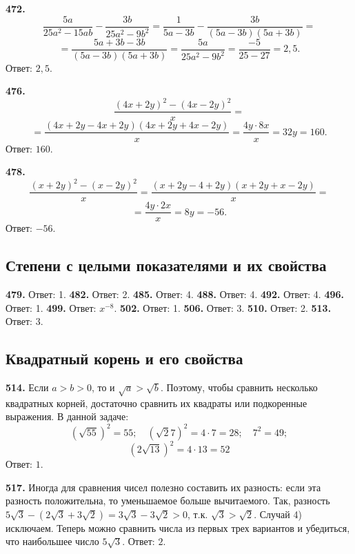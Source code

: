 \textbf{472.} $$\frac{5a}{25a^2-15ab}-\frac{3b}{25a^2-9b^2}=\frac{1}{5a-3b}-\frac{3b}{\left(5a-3b\right)\left(5a+3b\right)}=$$ $$=\frac{5a+3b-3b}{\left(5a-3b\right)\left(5a+3b\right)}=\frac{5a}{25a^2-9b^2}=\frac{-5}{25-27}=2,5.$$ \newline \null \hspace*{\fill} Ответ: $2,5$. 

\textbf{476.} $$\frac{\left(4x+2y\right)^2-\left(4x-2y\right)^2}{x}=$$$$=\frac{\left(4x+2y-4x+2y\right)\left(4x+2y+4x-2y\right)}{x}=\frac{4y\cdot8x}{x}=32y=160.$$ \newline \null \hspace*{\fill} Ответ: $160$. 

\textbf{478.} $$\frac{\left(x+2y\right)^2-\left(x-2y\right)^2}{x}=\frac{\left(x+2y-4+2y\right)\left(x+2y+x-2y\right)}{x}=$$ $$=\frac{4y\cdot2x}{x}=8y=-56.$$ \newline \null \hspace*{\fill} Ответ: $-56$. 

\subsection{Степени с целыми показателями и их свойства}


\textbf{479.}  Ответ: 1.  \textbf{482.}  Ответ: 2.  \textbf{485.}  Ответ: 4.  \textbf{488.}  Ответ: 4.  \textbf{492.}  Ответ: 4. \textbf{496.}  Ответ: 1. \textbf{499.}  Ответ: $x^{-8}$.   \textbf{502.}  Ответ: 1.  \textbf{506.} Ответ: 3. \textbf{510.}  Ответ: 2.  \textbf{513.}  Ответ: 3.

\subsection{Квадратный корень и его свойства}


\textbf{514.} Если $a>b>0$, то и $\sqrt{a}>\sqrt{b}$. Поэтому, чтобы сравнить несколько квадратных корней, достаточно сравнить их квадраты или подкоренные выражения.  В данной задаче: $$\left(\sqrt{55}\right)^2=55;\quad \left(\sqrt2{7}\right)^2=4\cdot7=28;\quad 7^2=49;$$$$ \left(2\sqrt{13}\right)^2=4\cdot13=52$$ \newline \null \hspace*{\fill} Ответ: $1$. 

\textbf{517.} Иногда для сравнения чисел полезно составить их разность: если эта разность положительна, то уменьшаемое больше вычитаемого. Так, разность $5\sqrt{3}-\left(2\sqrt{3}+3\sqrt{2}\right)=3\sqrt{3}-3\sqrt{2}>0$, т.к. $\sqrt{3}>\sqrt{2}$. Случай 4) исключаем. Теперь можно сравнить числа из первых трех вариантов и убедиться, что наибольшее число $5\sqrt{3}$. \newline \null \hspace*{\fill} Ответ: $2$. 


